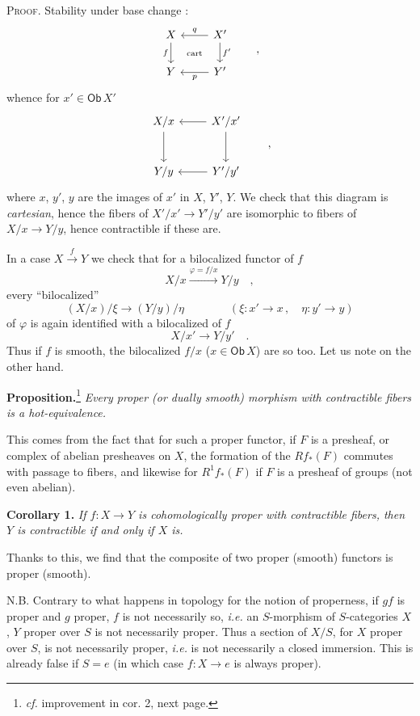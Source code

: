 \documentclass[11pt]{article}
\newcommand{\printedpage}[1]{\marginpar{\footnotesize p.~#1}}
\newcommand{\msp}[1]{\marginpar{\footnotesize [#1]}}
\newcommand{\Ob}{\mathsf{Ob}}
\begin{document}
\printedpage{31}

\noindent\msp{page 55}
\textsc{Proof}. Stability under base change :
\[
\begin{tikzcd}
X \arrow[d, "f"'] \arrow[dr, phantom, "\text{\scriptsize cart}"] & X' \arrow[l, "q"'] \arrow[d, "f'"] \\
Y & Y' \arrow[l, "p"]
\end{tikzcd}
\qquad ,
\]
whence for $x' \in \Ob\, X'$
\[
\begin{tikzcd}[row sep=large]
X/x \arrow[d] & X'/x' \arrow[l] \arrow[d] \\
Y/y & Y'/y' \arrow[l]
\end{tikzcd}
\qquad ,
\]
where $x$, $y'$, $y$ are the images of $x'$ in $X$, $Y'$, $Y$. We check that this diagram is \textit{cartesian}, hence the fibers of $X'/x' \longrightarrow Y'/y'$ are isomorphic to fibers of $X/x \longrightarrow Y/y$, hence contractible if these are.

In a case $X \xrightarrow{f} Y$ we check that for a bilocalized functor of $f$
\[
X/x \xrightarrow{\varphi=f/x} Y/y \quad ,
\]
every ``bilocalized''
\[
(X/x)/\xi \longrightarrow (Y/y)/\eta \qquad\qquad (\xi : x' \to x\,, \quad \eta : y' \to y)
\]
of $\varphi$ is again identified with a bilocalized of $f$
\[
X/x' \longrightarrow Y/y' \quad .
\]
Thus if $f$ is smooth, the bilocalized $f/x$ ($x \in \Ob\, X$) are so too. Let us note on the other hand.

\noindent\textbf{Proposition.}\footnote[24]{\textit{cf.} improvement in cor. 2, next page.} \textit{Every proper (or dually smooth) morphism with contractible fibers is a hot-equivalence.}

\noindent\msp{page 56}
This comes from the fact that for such a proper functor, if $F$ is a presheaf, or complex of abelian presheaves on $X$, the formation of the $Rf_*(F)$ commutes with passage to fibers, and likewise for $R^1f_*(F)$ if $F$ is a presheaf of groups (not even abelian).

\noindent\textbf{Corollary 1.} \textit{If $f : X \to Y$ is cohomologically proper with contractible fibers, then $Y$ is contractible if and only if $X$ is.}

Thanks to this, we find that the composite of two proper (smooth) functors is proper (smooth).

\printedpage{32}

\noindent N.B. Contrary to what happens in topology for the notion of properness, if $gf$ is proper and $g$ proper, $f$ is not necessarily so, \textit{i.e.} an $S$-morphism of $S$-categories $X$, $Y$ proper over $S$ is not necessarily proper. Thus a section of $X/S$, for $X$ proper over $S$, is not necessarily proper, \textit{i.e.} is not necessarily a closed immersion. This is already false if $S = e$ (in which case $f : X \to e$ is always proper).
\end{document}
